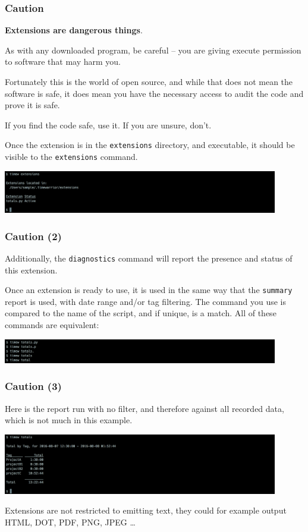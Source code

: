 \documentclass[t,handout]{beamer}
\begin{document}
\begin{frame}[fragile]\frametitle{Caution}
    \vfill
    \textbf{Extensions are dangerous things}.

    As with any downloaded program, be careful -- you are giving execute permission to software that may harm you.

    Fortunately this is the world of open source, and while that does not mean the software is safe, it does mean you have the necessary access to audit the code and prove it is safe.

    If you find the code safe, use it. If you are unsure, don't.

    Once the extension is in the \verb=extensions= directory, and executable, it should be visible to the \verb=extensions= command.

    \includegraphics[width=12cm]{images/tutorial46.png}
\end{frame}

\begin{frame}[fragile]\frametitle{Caution (2)}
    \vfill
    Additionally, the \verb=diagnostics= command will report the presence and status of this extension.

    Once an extension is ready to use, it is used in the same way that the \verb=summary= report is used, with date range and/or tag filtering. The command you use is compared to the name of the script, and if unique, is a match. All of these commands are equivalent:

    \includegraphics[width=12cm]{images/tutorial47.png}
\end{frame}

\begin{frame}[fragile]\frametitle{Caution (3)}
    \vfill
    Here is the report run with no filter, and therefore against all recorded data, which is not much in this example.

    \includegraphics[width=12cm]{images/tutorial48.png}

    Extensions are not restricted to emitting text, they could for example output HTML, DOT, PDF, PNG, JPEG \ldots
\end{frame}
\end{document}

